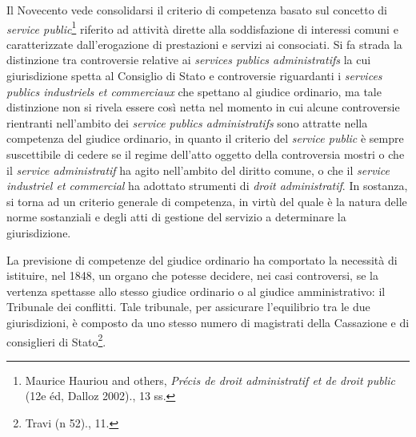 \documentclass[12pt,it,a4paper,]{report}
\begin{document}
Il Novecento vede consolidarsi il criterio di competenza basato sul
concetto di \emph{service public}\footnote{{Maurice Hauriou and others,
  \emph{Précis de droit administratif et de droit public} (12e éd,
  {Dalloz} 2002).}, 13 ss.} riferito ad attività dirette alla
soddisfazione di interessi comuni e caratterizzate dall'erogazione di
prestazioni e servizi ai consociati. Si fa strada la distinzione tra
controversie relative ai \emph{services publics administratifs} la cui
giurisdizione spetta al Consiglio di Stato e controversie riguardanti i
\emph{services publics industriels et commerciaux} che spettano al
giudice ordinario, ma tale distinzione non si rivela essere così netta
nel momento in cui alcune controversie rientranti nell'ambito dei
\emph{service publics administratifs} sono attratte nella competenza del
giudice ordinario, in quanto il criterio del \emph{service public} è
sempre suscettibile di cedere se il regime dell'atto oggetto della
controversia mostri o che il \emph{service administratif} ha agito
nell'ambito del diritto comune, o che il \emph{service industriel et
commercial} ha adottato strumenti di \emph{droit administratif}. In
sostanza, si torna ad un criterio generale di competenza, in virtù del
quale è la natura delle norme sostanziali e degli atti di gestione del
servizio a determinare la giurisdizione.

La previsione di competenze del giudice ordinario ha comportato la
necessità di istituire, nel 1848, un organo che potesse decidere, nei
casi controversi, se la vertenza spettasse allo stesso giudice ordinario
o al giudice amministrativo: il Tribunale dei conflitti. Tale tribunale,
per assicurare l'equilibrio tra le due giurisdizioni, è composto da uno
stesso numero di magistrati della Cassazione e di consiglieri di
Stato\footnote{{Travi (n 52).}, 11.}.
\end{document}
